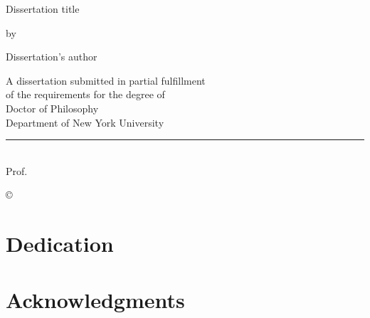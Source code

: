 \documentclass[12pt,letterpaper,oneside,final]{memoir}
\begin{document}
\fussy
{} %
\frontmatter
\hyphenation{}
\DoubleSpacing
\begin{center}
\thispagestyle{empty}

Dissertation title 

\vspace{20mm}
by\\
\vspace{10mm}

Dissertation's author

\vspace{10mm}
A dissertation submitted in partial fulfillment\\
of the requirements for the degree of\\
Doctor of Philosophy\\
Department of %
New York University\\
\end{center}
\vspace{35mm}
\begin{flushright}
{\rule[0pt]{45mm}{0.1mm}}\\

Prof. %

\end{flushright}

\newpage

\thispagestyle{empty}

\begin{center} © %
\end{center}


\newpage

\thispagestyle{empty}

\chapter{Dedication}

\DoubleSpacing

\newpage


\chapter{Acknowledgments}
\end{document}
